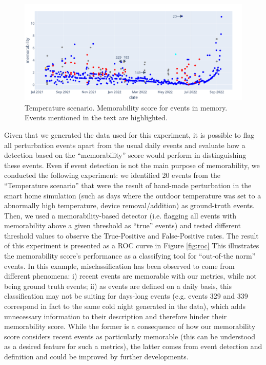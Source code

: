 \documentclass[entropy,article,submit,moreauthors,pdftex]{Definitions/mdpi}
\begin{document}
\begin{figure}[!ht]
    \centering
    \includegraphics[width=.9\linewidth]{figures/memo_scenar_2.png}
    \caption{Temperature scenario. Memorability score for events in memory. Events mentioned in the text are highlighted.}
    \label{fig:result1}
\end{figure}

Given that we generated the data used for this experiment, it is possible to
flag all perturbation events apart from the usual daily events and evaluate how a
detection based on the ``memorability'' score would perform in distinguishing these
events. Even if event detection is not the main purpose of memorability, we conducted the following experiment: we identified 20 events from the ``Temperature scenario'' that were the result of hand-made perturbation in the smart home simulation (such as days where the outdoor temperature was set to a abnormally high temperature, device removal/addition) as ground-truth events. Then, we used a memorability-based detector (i.e. flagging all events with memorability above a given threshold as ``true'' events) and tested different threshold values to observe the True-Positive and False-Positive rates. The result of this experiment is presented as a ROC curve in Figure \ref{fig:roc} This illustrates the memorability score's performance as a classifying tool for ``out-of-the norm'' events. In this example, misclassification has been observed to come from different phenomena: i) recent events are memorable with our metrics, while not being ground truth events; ii) as events are defined on a daily basis, this classification may not be suiting for days-long events (e.g. events 329 and 339 correspond in fact to the same cold night generated in the data), which adds unnecessary information to their description and therefore hinder their memorability score. While the former is a consequence of how our memorability score considers recent events as particularly memorable (this can be understood as a desired feature for such a metrics), the latter comes from event detection and definition and could be improved by further developments.
\end{document}
